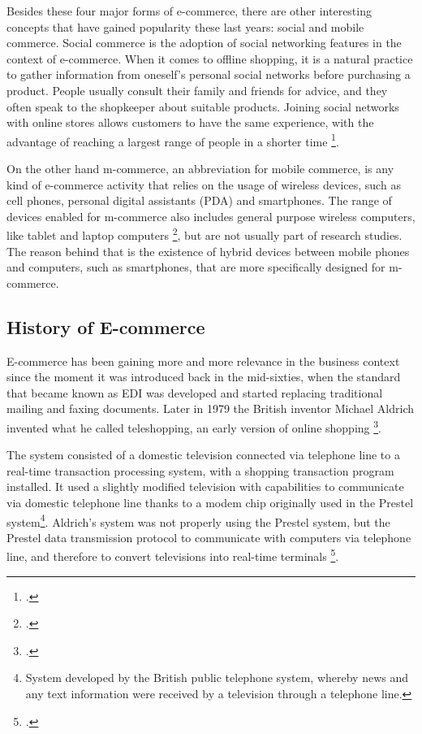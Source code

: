 Besides these four major forms of e-commerce, there are other interesting concepts that have gained popularity these last years: social and mobile commerce. Social commerce is the adoption of social networking features in the context of e-commerce. When it comes to offline shopping, it is a natural practice to gather information from oneself’s personal social networks before purchasing a product. People usually consult their family and friends for advice, and they often speak to the shopkeeper about suitable products. Joining social networks with online stores allows customers to have the same experience, with the advantage of reaching a largest range of people in a shorter time \footcite{GWL11}.

On the other hand m-commerce, an abbreviation for mobile commerce, is any kind of e-commerce activity that relies on the usage of wireless devices, such as cell phones, personal digital assistants (PDA) and smartphones. The range of devices enabled for m-commerce also includes general purpose wireless computers, like tablet and laptop computers \footcite{TNW01}, but are not usually part of research studies. The reason behind that is the existence of hybrid devices between mobile phones and computers, such as smartphones, that are more specifically designed for m-commerce.

\subsection{History of E-commerce}

E-commerce has been gaining more and more relevance in the business context since the moment it was introduced back in the mid-sixties, when the standard that became known as EDI was developed and started replacing traditional mailing and faxing documents. Later in 1979 the British inventor Michael Aldrich invented what he called teleshopping, an early version of online shopping \footcite{Ald10}.

The system consisted of a domestic television connected via telephone line to a real-time transaction processing system, with a shopping transaction program installed. It used a slightly modified television with capabilities to communicate via domestic telephone line thanks to a modem chip originally used in the Prestel system\footnote{System developed by the British public telephone system, whereby news and any text information were received by a television through a telephone line.}. Aldrich’s system was not properly using the Prestel system, but the Prestel data transmission protocol to communicate with computers via telephone line, and therefore to convert televisions into real-time terminals \footcite{Ald11}.

